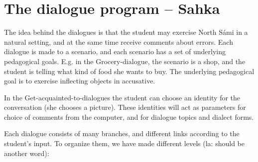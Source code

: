 \documentclass[11pt]{article}
\begin{document}
\section{The dialogue program -- Sahka}
The idea behind the dialogues is that the student may exercise North Sámi in a natural setting, and at the same time receive comments about errors. Each dialogue is made to a scenario, and each scenario has a set of underlying pedagogical goals. E.g. in the Grocery-dialogue, the scenario is a shop, and the student is telling what kind of food she wants to buy. The underlying pedagogical goal is to exercise inflecting objects in accusative.


In the Get-acquainted-to-dialogues the student can choose an identity for the conversation (she chooses a picture). These identities will act as parameters for choice of comments from the computer, and for dialogue topics and dialect forms.

%	

Each dialogue consists of many branches, and different links according to the student's input. To organize them, we have made different levels (la: should be another word):
\end{document}
